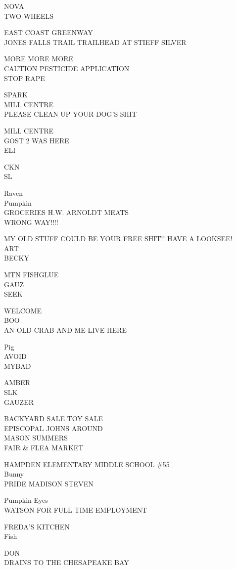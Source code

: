 \documentclass[10pt,letterpaper]{article}
\begin{document}
NOVA\\
TWO WHEELS

EAST COAST GREENWAY\\
JONES FALLS TRAIL TRAILHEAD AT STIEFF SILVER

MORE MORE MORE\\
CAUTION PESTICIDE APPLICATION\\
STOP RAPE

SPARK\\
MILL CENTRE\\
PLEASE CLEAN UP YOUR DOG'S SHIT

MILL CENTRE\\
GOST 2 WAS HERE\\
ELI

CKN\\
SL

Raven\\
Pumpkin\\
GROCERIES H.W. ARNOLDT MEATS\\
WRONG WAY!!!!

MY OLD STUFF COULD BE YOUR FREE SHIT!! HAVE A LOOKSEE!\\
ART\\
BECKY

MTN FISHGLUE\\
GAUZ\\
SEEK

WELCOME\\
BOO\\
AN OLD CRAB AND ME LIVE HERE

Pig\\
AVOID\\
MYBAD

AMBER\\
SLK\\
GAUZER

BACKYARD SALE TOY SALE\\
EPISCOPAL JOHNS AROUND\\
MASON SUMMERS\\
FAIR \& FLEA MARKET

HAMPDEN ELEMENTARY MIDDLE SCHOOL \#55\\
Bunny\\
PRIDE MADISON STEVEN

Pumpkin Eyes\\
WATSON FOR FULL TIME EMPLOYMENT

FREDA'S KITCHEN\\
Fish

DON\\
DRAINS TO THE CHESAPEAKE BAY
\end{document}
